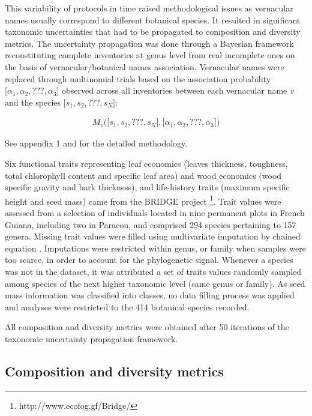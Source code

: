 \documentclass[fleqn,10pt]{ArtEcoFoG} %
\begin{document}
This variability of protocols in time raised methodological issues as
vernacular names usually correspond to different botanical species. It
resulted in significant taxonomic uncertainties that had to be
propagated to composition and diversity metrics. The uncertainty
propagation was done through a Bayesian framework reconstituting
complete inventories at genus level from real incomplete ones on the
basis of vernacular/botanical names association. Vernacular names were
replaced through multinomial trials based on the association probability
\(\big[\alpha_1, \alpha_2,???, \alpha_3\big]\) observed across all
inventories between each vernacular name \emph{v} and the species
\(\big[s_1, s_2, ???, s_N\big]\):

\begin{align}
M_v\Big(\big[s_1, s_2, ???, s_N\big],\big[\alpha_1, \alpha_2,???, \alpha_3\big]\Big) \nonumber
\end{align}

See appendix 1 and \citet{Aubry-Kientz2013} for the detailed
methodology.

Six functional traits representing leaf economics (leaves thickness,
toughness, total chlorophyll content and specific leaf area) and wood
economics (wood specific gravity and bark thickness), and life-history
traits (maximum specific height and seed mass) came from the BRIDGE
project \footnote{http://www.ecofog.gf/Bridge/}. Trait values were
assessed from a selection of individuals located in nine permanent plots
in French Guiana, including two in Paracou, and comprised 294 species
pertaining to 157 genera. Missing trait values were filled using
multivariate imputation by chained equation \citep{Mice2011}.
Imputations were restricted within genus, or family when samples were
too scarce, in order to account for the phylogenetic signal. Whenever a
species was not in the dataset, it was attributed a set of traits values
randomly sampled among species of the next higher taxonomic level (same
genus or family). As seed mass information was classified into classes,
no data filling process was applied and analyses were restricted to the
414 botanical species recorded.

All composition and diversity metrics were obtained after 50 iterations
of the taxonomic uncertainty propagation framework.

\subsection{Composition and diversity
metrics}\label{composition-and-diversity-metrics}
\end{document}
